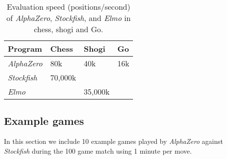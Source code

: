 \documentclass[12pt]{article}
\begin{document}
\begin{table}
\begin{tabularx}{\textwidth}{XXXX}
\toprule
Program & Chess & Shogi & Go \\
\midrule
\emph{AlphaZero} & 80k & 40k & 16k \\
\emph{Stockfish} & 70,000k & \\
\emph{Elmo} && 35,000k & \\
\bottomrule
\end{tabularx}
\caption{
\label{tab:speed}
Evaluation speed (positions/second) of \emph{AlphaZero}, \emph{Stockfish}, and \emph{Elmo} in chess, shogi and Go.
}
\end{table}

\subsection*{Example games}

In this section we include 10 example games played by \emph{AlphaZero} against \emph{Stockfish} during the 100 game match using 1 minute per move.
\end{document}
